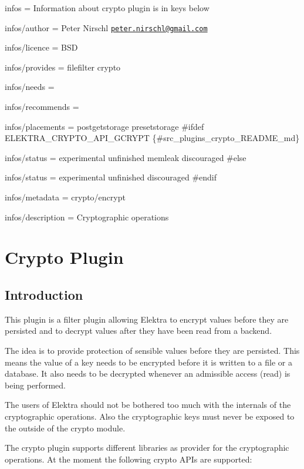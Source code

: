 
\begin{DoxyItemize}
\item infos = Information about crypto plugin is in keys below
\item infos/author = Peter Nirschl \href{mailto:peter.nirschl@gmail.com}{\tt peter.\+nirschl@gmail.\+com}
\item infos/licence = B\+S\+D
\item infos/provides = filefilter crypto
\item infos/needs =
\item infos/recommends =
\item infos/placements = postgetstorage presetstorage \#ifdef E\+L\+E\+K\+T\+R\+A\+\_\+\+C\+R\+Y\+P\+T\+O\+\_\+\+A\+P\+I\+\_\+\+G\+C\+R\+Y\+P\+T \{\#src\+\_\+plugins\+\_\+crypto\+\_\+\+R\+E\+A\+D\+M\+E\+\_\+md\}
\item infos/status = experimental unfinished memleak discouraged \#else
\item infos/status = experimental unfinished discouraged \#endif
\item infos/metadata = crypto/encrypt
\item infos/description = Cryptographic operations
\end{DoxyItemize}

\section*{Crypto Plugin}

\subsection*{Introduction}

This plugin is a filter plugin allowing Elektra to encrypt values before they are persisted and to decrypt values after they have been read from a backend.

The idea is to provide protection of sensible values before they are persisted. This means the value of a key needs to be encrypted before it is written to a file or a database. It also needs to be decrypted whenever an admissible access (read) is being performed.

The users of Elektra should not be bothered too much with the internals of the cryptographic operations. Also the cryptographic keys must never be exposed to the outside of the crypto module.

The crypto plugin supports different libraries as provider for the cryptographic operations. At the moment the following crypto A\+P\+Is are supported\+:


